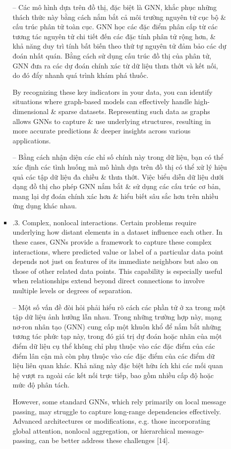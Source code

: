 \documentclass{article}
\begin{document}
\begin{itemize}
\begin{itemize}
\begin{itemize}
            -- Các mô hình dựa trên đồ thị, đặc biệt là GNN, khắc phục những thách thức này bằng cách nắm bắt cả môi trường nguyên tử cục bộ \& cấu trúc phân tử toàn cục. GNN học các đặc điểm phân cấp từ các tương tác nguyên tử chi tiết đến các đặc tính phân tử rộng hơn, \& khả năng duy trì tính bất biến theo thứ tự nguyên tử đảm bảo các dự đoán nhất quán. Bằng cách sử dụng cấu trúc đồ thị của phân tử, GNN đưa ra các dự đoán chính xác từ dữ liệu thưa thớt và kết nối, do đó đẩy nhanh quá trình khám phá thuốc.

            By recognizing these key indicators in your data, you can identify situations where graph-based models can effectively handle high-dimensional \& sparse datasets. Representing such data as graphs allows GNNs to capture \& use underlying structures, resulting in more accurate predictions \& deeper insights across various applications.

            -- Bằng cách nhận diện các chỉ số chính này trong dữ liệu, bạn có thể xác định các tình huống mà mô hình dựa trên đồ thị có thể xử lý hiệu quả các tập dữ liệu đa chiều \& thưa thớt. Việc biểu diễn dữ liệu dưới dạng đồ thị cho phép GNN nắm bắt \& sử dụng các cấu trúc cơ bản, mang lại dự đoán chính xác hơn \& hiểu biết sâu sắc hơn trên nhiều ứng dụng khác nhau.
            \item {.3. Complex, nonlocal interactions.} Certain problems require underlying how distant elements in a dataset influence each other. In these cases, GNNs provide a framework to capture these complex interactions, where predicted value or label of a particular data point depends not just on features of its immediate neighbors but also on those of other related data points. This capability is especially useful when relationships extend beyond direct connections to involve multiple levels or degrees of separation.

            -- Một số vấn đề đòi hỏi phải hiểu rõ cách các phần tử ở xa trong một tập dữ liệu ảnh hưởng lẫn nhau. Trong những trường hợp này, mạng nơ-ron nhân tạo (GNN) cung cấp một khuôn khổ để nắm bắt những tương tác phức tạp này, trong đó giá trị dự đoán hoặc nhãn của một điểm dữ liệu cụ thể không chỉ phụ thuộc vào các đặc điểm của các điểm lân cận mà còn phụ thuộc vào các đặc điểm của các điểm dữ liệu liên quan khác. Khả năng này đặc biệt hữu ích khi các mối quan hệ vượt ra ngoài các kết nối trực tiếp, bao gồm nhiều cấp độ hoặc mức độ phân tách.

            However, some standard GNNs, which rely primarily on local message passing, may struggle to capture long-range dependencies effectively. Advanced architectures or modifications, e.g. those incorporating global attention, nonlocal aggregation, or hierarchical message-passing, can be better address these challenges [14].


\end{itemize}
\end{itemize}
\end{itemize}
\end{document}
